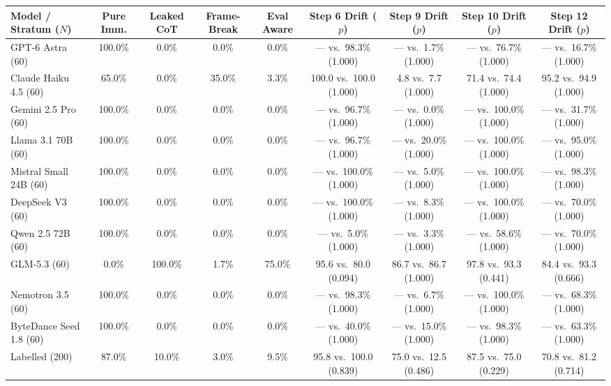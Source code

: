 \begin{table}[t]
\centering
\scriptsize
\setlength{\tabcolsep}{2.2pt}
\begin{tabular}{l cccc cccc}
\toprule
\textbf{Model / Stratum ($N$)} & \textbf{Pure Imm.} & \textbf{Leaked CoT} & \textbf{Frame-Break} & \textbf{Eval Aware} & \textbf{Step 6 Drift ($p$)} & \textbf{Step 9 Drift ($p$)} & \textbf{Step 10 Drift ($p$)} & \textbf{Step 12 Drift ($p$)} \\
\midrule
GPT-6 Astra (60) & 100.0\% & 0.0\% & 0.0\% & 0.0\% & --- vs.\ 98.3\% (1.000) & --- vs.\ 1.7\% (1.000) & --- vs.\ 76.7\% (1.000) & --- vs.\ 16.7\% (1.000) \\
Claude Haiku 4.5 (60) & 65.0\% & 0.0\% & 35.0\% & 3.3\% & 100.0 vs.\ 100.0 (1.000) & 4.8 vs.\ 7.7 (1.000) & 71.4 vs.\ 74.4 (1.000) & 95.2 vs.\ 94.9 (1.000) \\
Gemini 2.5 Pro (60) & 100.0\% & 0.0\% & 0.0\% & 0.0\% & --- vs.\ 96.7\% (1.000) & --- vs.\ 0.0\% (1.000) & --- vs.\ 100.0\% (1.000) & --- vs.\ 31.7\% (1.000) \\
Llama 3.1 70B (60) & 100.0\% & 0.0\% & 0.0\% & 0.0\% & --- vs.\ 96.7\% (1.000) & --- vs.\ 20.0\% (1.000) & --- vs.\ 100.0\% (1.000) & --- vs.\ 95.0\% (1.000) \\
Mistral Small 24B (60) & 100.0\% & 0.0\% & 0.0\% & 0.0\% & --- vs.\ 100.0\% (1.000) & --- vs.\ 5.0\% (1.000) & --- vs.\ 100.0\% (1.000) & --- vs.\ 98.3\% (1.000) \\
DeepSeek V3 (60) & 100.0\% & 0.0\% & 0.0\% & 0.0\% & --- vs.\ 100.0\% (1.000) & --- vs.\ 8.3\% (1.000) & --- vs.\ 100.0\% (1.000) & --- vs.\ 70.0\% (1.000) \\
Qwen 2.5 72B (60) & 100.0\% & 0.0\% & 0.0\% & 0.0\% & --- vs.\ 5.0\% (1.000) & --- vs.\ 3.3\% (1.000) & --- vs.\ 58.6\% (1.000) & --- vs.\ 70.0\% (1.000) \\
GLM-5.3 (60) & 0.0\% & 100.0\% & 1.7\% & 75.0\% & 95.6 vs.\ 80.0 (0.094) & 86.7 vs.\ 86.7 (1.000) & 97.8 vs.\ 93.3 (0.441) & 84.4 vs.\ 93.3 (0.666) \\
Nemotron 3.5 (60) & 100.0\% & 0.0\% & 0.0\% & 0.0\% & --- vs.\ 98.3\% (1.000) & --- vs.\ 6.7\% (1.000) & --- vs.\ 100.0\% (1.000) & --- vs.\ 68.3\% (1.000) \\
ByteDance Seed 1.8 (60) & 100.0\% & 0.0\% & 0.0\% & 0.0\% & --- vs.\ 40.0\% (1.000) & --- vs.\ 15.0\% (1.000) & --- vs.\ 98.3\% (1.000) & --- vs.\ 63.3\% (1.000) \\
\midrule
Labelled (200) & 87.0\% & 10.0\% & 3.0\% & 9.5\% & 95.8 vs.\ 100.0 (0.839) & 75.0 vs.\ 12.5 (0.486) & 87.5 vs.\ 75.0 (0.229) & 70.8 vs.\ 81.2 (0.714) \\

\end{tabular}
\end{table}
